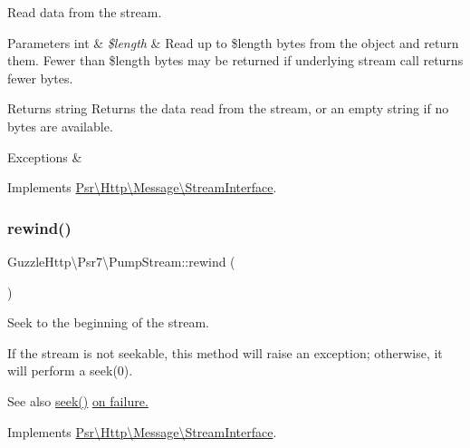 Read data from the stream.


\begin{DoxyParams}[1]{Parameters}
int & {\em \$length} & Read up to \$length bytes from the object and return them. Fewer than \$length bytes may be returned if underlying stream call returns fewer bytes. \\
\hline
\end{DoxyParams}
\begin{DoxyReturn}{Returns}
string Returns the data read from the stream, or an empty string if no bytes are available. 
\end{DoxyReturn}

\begin{DoxyExceptions}{Exceptions}
{\em } & \\
\hline
\end{DoxyExceptions}


Implements \hyperlink{interfacePsr_1_1Http_1_1Message_1_1StreamInterface_ad41b4afe827e179dfb4b988e98cccb12}{Psr\textbackslash{}\+Http\textbackslash{}\+Message\textbackslash{}\+Stream\+Interface}.

\mbox{\label{classGuzzleHttp_1_1Psr7_1_1PumpStream_adc397c8abc8205c9aaefc12ff3bd1bfa}} 
\subsubsection{\texorpdfstring{rewind()}{rewind()}}
{\footnotesize\ttfamily Guzzle\+Http\textbackslash{}\+Psr7\textbackslash{}\+Pump\+Stream\+::rewind (\begin{DoxyParamCaption}{ }\end{DoxyParamCaption})}

Seek to the beginning of the stream.

If the stream is not seekable, this method will raise an exception; otherwise, it will perform a seek(0).

\begin{DoxySeeAlso}{See also}
\hyperlink{classGuzzleHttp_1_1Psr7_1_1PumpStream_a9245d47aa4ba82439759d407115e4c5a}{seek()} \hyperlink{}{on failure. }
\end{DoxySeeAlso}


Implements \hyperlink{interfacePsr_1_1Http_1_1Message_1_1StreamInterface_a48721ef4d5097250a3f94515938393c9}{Psr\textbackslash{}\+Http\textbackslash{}\+Message\textbackslash{}\+Stream\+Interface}.

